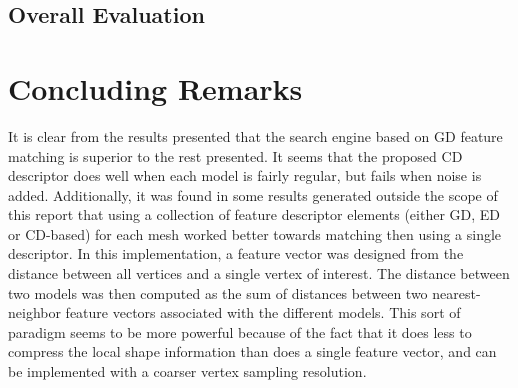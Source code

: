 \documentclass[12pt]{article}
\begin{document}
	\subsection*{Overall Evaluation}

\newpage
\section*{Concluding Remarks}
	
	It is clear from the results presented that the search engine based on GD feature matching is superior to the rest presented. It seems that the proposed CD descriptor does well when each model is fairly regular, but fails when noise is added. Additionally, it was found in some results generated outside the scope of this report that using a collection of feature descriptor elements (either GD, ED or CD-based) for each mesh worked better towards matching then using a single descriptor. In this implementation, a feature vector was designed from the distance between all vertices and a single vertex of interest. The distance between two models was then computed as the sum of distances between two nearest-neighbor feature vectors associated with the different models. This sort of paradigm seems to be more powerful because of the fact that it does less to compress the local shape information than does a single feature vector, and can be implemented with a coarser vertex sampling resolution. 


	{}
	
\end{document}
